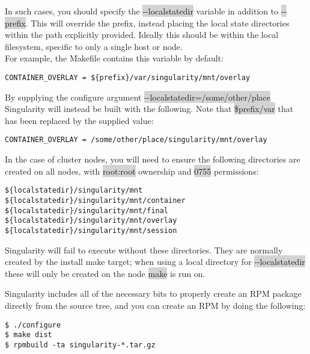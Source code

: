 \documentclass[a4paper]{article}
\newcounter{subsubsubsection}[subsubsection]
\begin{document}
In such cases, you should specify the \colorbox{lightgray}{-{}-localstatedir} variable in addition to \colorbox{lightgray}{-{}-prefix}. This will override the prefix, instead placing the local state directories within the path explicitly provided. Ideally this should be within the local filesystem, specific to only a single host or node.\\[0.1in]

For example, the Makefile contains this variable by default:

\begin{lstlisting}[frame=single]
CONTAINER_OVERLAY = ${prefix}/var/singularity/mnt/overlay
\end{lstlisting}

By supplying the configure argument \colorbox{lightgray}{-{}-localstatedir=/some/other/place} Singularity will instead be built with the following. Note that \colorbox{lightgray}{\${prefix}/var} that has been replaced by the supplied value:

\begin{lstlisting}[frame=single]
CONTAINER_OVERLAY = /some/other/place/singularity/mnt/overlay
\end{lstlisting}

In the case of cluster nodes, you will need to ensure the following directories are created on all nodes, with \colorbox{lightgray}{root:root} ownership and \colorbox{lightgray}{0755} permissions:

\begin{lstlisting}[frame=single]
${localstatedir}/singularity/mnt
${localstatedir}/singularity/mnt/container
${localstatedir}/singularity/mnt/final
${localstatedir}/singularity/mnt/overlay
${localstatedir}/singularity/mnt/session
\end{lstlisting}

Singularity will fail to execute without these directories. They are normally created by the install make target; when using a local directory for  \colorbox{lightgray}{-{}-localstatedir} these will only be created on the node  \colorbox{lightgray}{make} is run on.




Singularity includes all of the necessary bits to properly create an RPM package directly from the source tree, and you can create an RPM by doing the following:


\begin{lstlisting}[frame=single]
$ ./configure
$ make dist
$ rpmbuild -ta singularity-*.tar.gz
\end{lstlisting}
\end{document}
